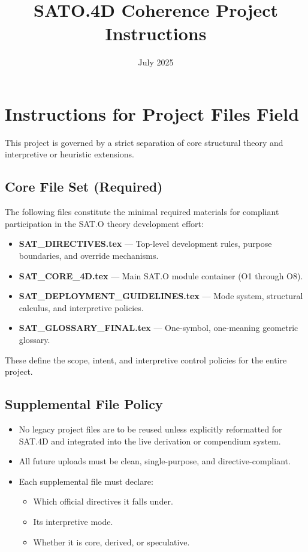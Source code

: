 \documentclass[12pt]{article}
\title{SATO.4D Coherence Project Instructions}
\date{July 2025}
\begin{document}
\maketitle

\section*{Instructions for Project Files Field}

This project is governed by a strict separation of core structural theory and interpretive or heuristic extensions.

\subsection*{Core File Set (Required)}
The following files constitute the minimal required materials for compliant participation in the SAT.O theory development effort:

\begin{itemize}
    \item \textbf{SAT\_DIRECTIVES.tex} — Top-level development rules, purpose boundaries, and override mechanisms.
    \item \textbf{SAT\_CORE\_4D.tex} — Main SAT.O module container (O1 through O8).
    \item \textbf{SAT\_DEPLOYMENT\_GUIDELINES.tex} — Mode system, structural calculus, and interpretive policies.
    \item \textbf{SAT\_GLOSSARY\_FINAL.tex} — One-symbol, one-meaning geometric glossary.
\end{itemize}

These define the scope, intent, and interpretive control policies for the entire project.

\subsection*{Supplemental File Policy}

\begin{itemize}
    \item No legacy project files are to be reused unless explicitly reformatted for SAT.4D and integrated into the live derivation or compendium system.
    \item All future uploads must be clean, single-purpose, and directive-compliant.
    \item Each supplemental file must declare:
        \begin{itemize}
            \item Which official directives it falls under.
            \item Its interpretive mode.
            \item Whether it is core, derived, or speculative.
        \end{itemize}
\end{itemize}
\end{document}
